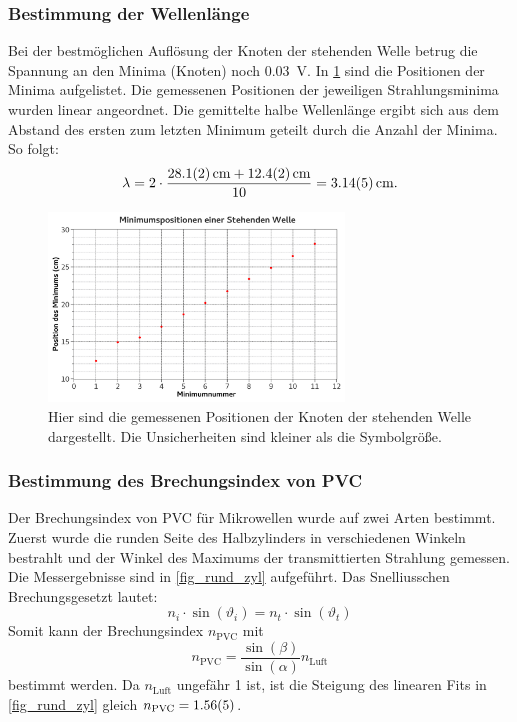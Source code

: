 \documentclass[
	a4paper,
	12pt,
	pagesize,
	ngerman
]{scrartcl}
\begin{document}
	\subsubsection{Bestimmung der Wellenlänge}
	Bei der bestmöglichen Auflösung der Knoten der stehenden Welle betrug die Spannung an den Minima (Knoten) noch \SI{0,03}{V}.
	In \cref{fig_steh_welle} sind die Positionen der Minima aufgelistet.
	Die gemessenen Positionen der jeweiligen Strahlungsminima wurden linear angeordnet. 
	Die gemittelte halbe Wellenlänge ergibt sich aus dem Abstand des ersten zum letzten Minimum geteilt durch die Anzahl der Minima. %
	So folgt: 
	\begin{equation}
		\lambda = 2 \cdot \frac{\SI{28,1 +- 0,2}{cm} + \SI{12,4+-0,2}{cm}}{10} = \SI{3,14 +- 0,05}{cm}.
	\end{equation}
	\begin{figure}[H] %
		\includegraphics[width=0.7\textwidth]{fig_steh_welle}
		\centering
		\caption{Hier sind die gemessenen Positionen der Knoten der stehenden Welle dargestellt. Die Unsicherheiten sind kleiner als die Symbolgröße.}
		\label{fig_steh_welle}
		\centering
	\end{figure}
	\subsubsection{Bestimmung des Brechungsindex von PVC}
	Der Brechungsindex von PVC für Mikrowellen wurde auf zwei Arten bestimmt. 
	Zuerst wurde die runden Seite des Halbzylinders in verschiedenen Winkeln bestrahlt und der Winkel des Maximums der transmittierten Strahlung gemessen.
	Die Messergebnisse sind in \cref{fig_rund_zyl} aufgeführt.
	Das Snelliusschen Brechungsgesetzt lautet:
	\begin{equation}
		n_i \cdot \sin(\vartheta_i) = n_t \cdot \sin(\vartheta_t)
		\label{eq_snellius}
	\end{equation}
	Somit kann der Brechungsindex $n_\text{PVC}$  mit 
	\begin{equation}
		n_\text{PVC} = \frac{\sin(\beta)}{\sin(\alpha)} n_\text{Luft}
	\end{equation}
	bestimmt werden.
	Da $n_\text{Luft}$ ungefähr 1 ist, ist die Steigung des linearen Fits in \cref{fig_rund_zyl} gleich $n_\text{PVC}=\SI{1,56 +- 0,05}{}$.
\end{document}

